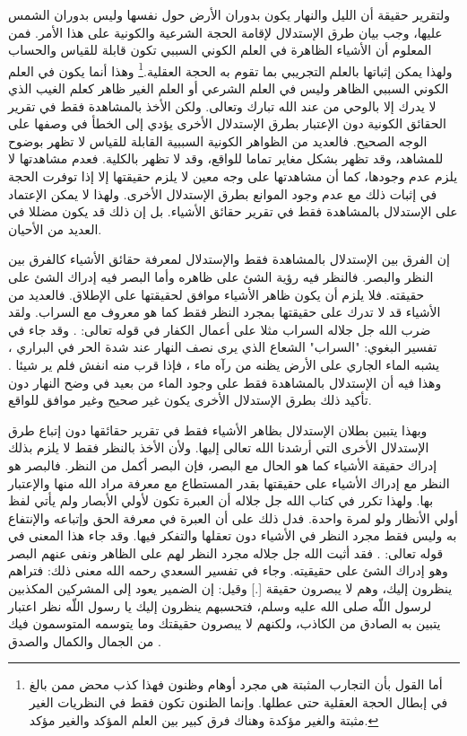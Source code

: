 ولتقرير حقيقة أن الليل والنهار يكون بدوران الأرض حول نفسها وليس بدوران الشمس عليها، وجب بيان طرق الإستدلال لإقامة الحجة الشرعية والكونية على هذا الأمر. فمن المعلوم أن الأشياء الظاهرة في العلم الكوني السببي تكون قابلة للقياس والحساب ولهذا يمكن إثباتها بالعلم التجريبي بما تقوم به الحجة العقلية.\footnote{أما القول بأن التجارب المثبتة هي مجرد أوهام وظنون فهذا كذب محض ممن بالغ في إبطال الحجة العقلية حتى عطلها. وإنما الظنون تكون فقط في النظريات الغير مثبتة والغير مؤكدة وهناك فرق كبير بين العلم المؤكد والغير مؤكد.} وهذا أنما يكون في العلم الكوني السببي الظاهر وليس في العلم الشرعي أو العلم الغير ظاهر كعلم الغيب الذي لا يدرك إلا بالوحي من عند الله تبارك وتعالى. ولكن الأخذ بالمشاهدة فقط في تقرير الحقائق الكونية دون الإعتبار بطرق الإستدلال الأخرى يؤدي إلى الخطأ في وصفها على الوجه الصحيح. فالعديد من الظواهر الكونية السببية القابلة للقياس لا تظهر بوضوح للمشاهد، وقد تظهر بشكل مغاير تماما للواقع، وقد لا تظهر بالكلية. فعدم مشاهدتها لا يلزم عدم وجودها، كما أن مشاهدتها على وجه معين لا يلزم حقيقتها إلا إذا توفرت الحجة في إثبات ذلك مع عدم وجود الموانع بطرق الإستدلال الأخرى. ولهذا لا يمكن الإعتماد على الإستدلال بالمشاهدة فقط في تقرير حقائق الأشياء. بل إن ذلك قد يكون مضللا في العديد من الأحيان.

إن الفرق بين الإستدلال بالمشاهدة فقط والإستدلال لمعرفة حقائق الأشياء كالفرق بين النظر والبصر. فالنظر فيه رؤية الشئ على ظاهره وأما البصر فيه إدراك الشئ على حقيقته. فلا يلزم أن يكون ظاهر الأشياء موافق لحقيقتها على الإطلاق. فالعديد من الأشياء قد لا تدرك على حقيقتها بمجرد النظر فقط كما هو معروف مع السراب. ولقد ضرب الله جل جلاله السراب مثلا على أعمال الكفار في قوله تعالى: \quranayah*[24][39]{\footnotesize \surahname*[24]}. وقد جاء في تفسير البغوي: "السراب" الشعاع الذي يرى نصف النهار عند شدة الحر في البراري ، يشبه الماء الجاري على الأرض يظنه من رآه ماء ، فإذا قرب منه انفش فلم ير شيئا \cite{tafsir_Baghawi}. وهذا فيه أن الإستدلال بالمشاهدة فقط على وجود الماء من بعيد في وضح النهار دون تأكيد ذلك بطرق الإستدلال الأخرى يكون غير صحيح وغير موافق للواقع. 


وبهذا يتبين بطلان الإستدلال بظاهر الأشياء فقط في تقرير حقائقها دون إتباع طرق الإستدلال الأخرى التي أرشدنا الله تعالى إليها. ولأن الأخذ بالنظر فقط لا يلزم بذلك إدراك حقيقة الأشياء كما هو الحال مع البصر، فإن البصر أكمل من النظر. فالبصر هو النظر مع إدراك الأشياء على حقيقتها بقدر المستطاع مع معرفة مراد الله منها والإعتبار بها. ولهذا تكرر في كتاب الله جل جلاله أن العبرة تكون لأولي الأبصار ولم يأتي لفظ أولي الأنظار ولو لمرة واحدة. فدل ذلك على أن العبرة في معرفة الحق وإتباعه والإنتفاع به وليس فقط مجرد النظر في الأشياء دون تعقلها والتفكر فيها.
وقد جاء هذا المعنى في قوله تعالى: \quranayah*[7][198]{\footnotesize \surahname*[7]}. فقد أثبت الله جل جلاله مجرد النظر لهم على الظاهر ونفى عنهم البصر وهو إدراك الشئ على حقيقيته. وجاء في تفسير السعدي رحمه الله معنى ذلك: فتراهم ينظرون إليك، وهم لا يبصرون حقيقة [.] وقيل: إن الضمير يعود إلى المشركين المكذبين لرسول اللّه صلى الله عليه وسلم، فتحسبهم ينظرون إليك يا رسول اللّه نظر اعتبار يتبين به الصادق من الكاذب، ولكنهم لا يبصرون حقيقتك وما يتوسمه المتوسمون فيك من الجمال والكمال والصدق \cite{tafsir_Saadi}.

